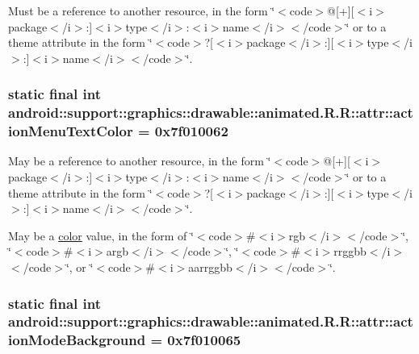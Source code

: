Must be a reference to another resource, in the form \char`\"{}$<$code$>$@\mbox{[}+\mbox{]}\mbox{[}$<$i$>$package$<$/i$>$:\mbox{]}$<$i$>$type$<$/i$>$:$<$i$>$name$<$/i$>$$<$/code$>$\char`\"{} or to a theme attribute in the form \char`\"{}$<$code$>$?\mbox{[}$<$i$>$package$<$/i$>$:\mbox{]}\mbox{[}$<$i$>$type$<$/i$>$:\mbox{]}$<$i$>$name$<$/i$>$$<$/code$>$\char`\"{}. \hypertarget{classandroid_1_1support_1_1graphics_1_1drawable_1_1animated_1_1_r_1_1attr_a1935234dedcbb37fc7d9ec40fdd7781}{
\subsubsection[{actionMenuTextColor}]{\setlength{\rightskip}{0pt plus 5cm}static final int android::support::graphics::drawable::animated.R.R::attr::actionMenuTextColor = 0x7f010062}}
\label{classandroid_1_1support_1_1graphics_1_1drawable_1_1animated_1_1_r_1_1attr_a1935234dedcbb37fc7d9ec40fdd7781}


May be a reference to another resource, in the form \char`\"{}$<$code$>$@\mbox{[}+\mbox{]}\mbox{[}$<$i$>$package$<$/i$>$:\mbox{]}$<$i$>$type$<$/i$>$:$<$i$>$name$<$/i$>$$<$/code$>$\char`\"{} or to a theme attribute in the form \char`\"{}$<$code$>$?\mbox{[}$<$i$>$package$<$/i$>$:\mbox{]}\mbox{[}$<$i$>$type$<$/i$>$:\mbox{]}$<$i$>$name$<$/i$>$$<$/code$>$\char`\"{}. 

May be a \hyperlink{classandroid_1_1support_1_1graphics_1_1drawable_1_1animated_1_1_r_1_1color}{color} value, in the form of \char`\"{}$<$code$>$\#$<$i$>$rgb$<$/i$>$$<$/code$>$\char`\"{}, \char`\"{}$<$code$>$\#$<$i$>$argb$<$/i$>$$<$/code$>$\char`\"{}, \char`\"{}$<$code$>$\#$<$i$>$rrggbb$<$/i$>$$<$/code$>$\char`\"{}, or \char`\"{}$<$code$>$\#$<$i$>$aarrggbb$<$/i$>$$<$/code$>$\char`\"{}. \hypertarget{classandroid_1_1support_1_1graphics_1_1drawable_1_1animated_1_1_r_1_1attr_5f34120e3163efffe2a36712f0cd9b22}{
\subsubsection[{actionModeBackground}]{\setlength{\rightskip}{0pt plus 5cm}static final int android::support::graphics::drawable::animated.R.R::attr::actionModeBackground = 0x7f010065}}
\label{classandroid_1_1support_1_1graphics_1_1drawable_1_1animated_1_1_r_1_1attr_5f34120e3163efffe2a36712f0cd9b22}


